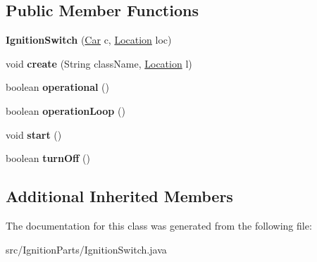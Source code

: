\subsection*{Public Member Functions}
\begin{DoxyCompactItemize}
\item 
\hypertarget{classIgnitionParts_1_1IgnitionSwitch_a4bc60395249312bdf34e31f026edf9fb}{}{\bfseries Ignition\+Switch} (\hyperlink{classCars_1_1Car}{Car} c, \hyperlink{enumEnums_1_1Location}{Location} loc)\label{classIgnitionParts_1_1IgnitionSwitch_a4bc60395249312bdf34e31f026edf9fb}

\item 
\hypertarget{classIgnitionParts_1_1IgnitionSwitch_a16dbac46fd19f70b949905108ed1cbb3}{}void {\bfseries create} (String class\+Name, \hyperlink{enumEnums_1_1Location}{Location} l)\label{classIgnitionParts_1_1IgnitionSwitch_a16dbac46fd19f70b949905108ed1cbb3}

\item 
\hypertarget{classIgnitionParts_1_1IgnitionSwitch_ab35e1290ccba8ff40eef971c56bc96c7}{}boolean {\bfseries operational} ()\label{classIgnitionParts_1_1IgnitionSwitch_ab35e1290ccba8ff40eef971c56bc96c7}

\item 
\hypertarget{classIgnitionParts_1_1IgnitionSwitch_ad9cc1014a08c9f12411e1fe5c064a4ff}{}boolean {\bfseries operation\+Loop} ()\label{classIgnitionParts_1_1IgnitionSwitch_ad9cc1014a08c9f12411e1fe5c064a4ff}

\item 
\hypertarget{classIgnitionParts_1_1IgnitionSwitch_ad00f4d11cedbdf9a4ea576134cd39aa4}{}void {\bfseries start} ()\label{classIgnitionParts_1_1IgnitionSwitch_ad00f4d11cedbdf9a4ea576134cd39aa4}

\item 
\hypertarget{classIgnitionParts_1_1IgnitionSwitch_a7d2dfa5d1c7efc65538b60cac41bf5b1}{}boolean {\bfseries turn\+Off} ()\label{classIgnitionParts_1_1IgnitionSwitch_a7d2dfa5d1c7efc65538b60cac41bf5b1}

\end{DoxyCompactItemize}
\subsection*{Additional Inherited Members}


The documentation for this class was generated from the following file\+:\begin{DoxyCompactItemize}
\item 
src/\+Ignition\+Parts/Ignition\+Switch.\+java\end{DoxyCompactItemize}

